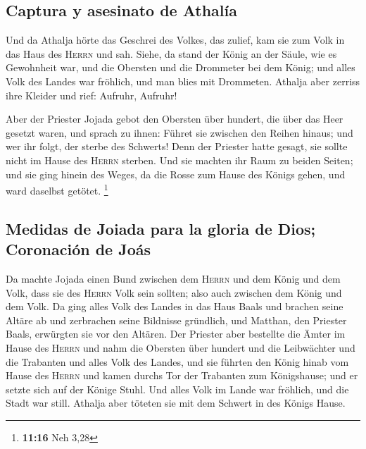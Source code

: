 \hypertarget{captura-y-asesinato-de-athaluxeda}{%
\subsection{Captura y asesinato de
Athalía}\label{captura-y-asesinato-de-athaluxeda}}

 Und da Athalja hörte das Geschrei des Volkes, das
zulief, kam sie zum Volk in das Haus des \textsc{Herrn} 
und sah. Siehe, da stand der König an der Säule, wie es Gewohnheit war,
und die Obersten und die Drommeter bei dem König; und alles Volk des
Landes war fröhlich, und man blies mit Drommeten. Athalja aber zerriss
ihre Kleider und rief: Aufruhr, Aufruhr!

 Aber der Priester Jojada gebot den Obersten über
hundert, die über das Heer gesetzt waren, und sprach zu ihnen: Führet
sie zwischen den Reihen hinaus; und wer ihr folgt, der sterbe des
Schwerts! Denn der Priester hatte gesagt, sie sollte nicht im Hause des
\textsc{Herrn} sterben.  Und sie machten ihr Raum zu
beiden Seiten; und sie ging hinein des Weges, da die Rosse zum Hause des
Königs gehen, und ward daselbst getötet. \footnote{\textbf{11:16} Neh
  3,28}

\hypertarget{medidas-de-joiada-para-la-gloria-de-dios-coronaciuxf3n-de-jouxe1s}{%
\subsection{Medidas de Joiada para la gloria de Dios; Coronación de
Joás}\label{medidas-de-joiada-para-la-gloria-de-dios-coronaciuxf3n-de-jouxe1s}}

 Da machte Jojada einen Bund zwischen dem \textsc{Herrn}
und dem König und dem Volk, dass sie des \textsc{Herrn} Volk sein
sollten; also auch zwischen dem König und dem Volk.  Da
ging alles Volk des Landes in das Haus Baals und brachen seine Altäre ab
und zerbrachen seine Bildnisse gründlich, und Matthan, den Priester
Baals, erwürgten sie vor den Altären. Der Priester aber bestellte die
Ämter im Hause des \textsc{Herrn}  und nahm die Obersten
über hundert und die Leibwächter und die Trabanten und alles Volk des
Landes, und sie führten den König hinab vom Hause des \textsc{Herrn} und
kamen durchs Tor der Trabanten zum Königshause; und er setzte sich auf
der Könige Stuhl.  Und alles Volk im Lande war fröhlich,
und die Stadt war still. Athalja aber töteten sie mit dem Schwert in des
Königs Hause.

